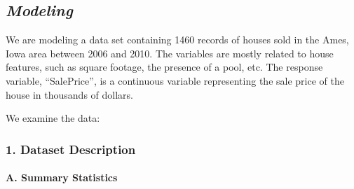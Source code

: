 \documentclass[
]{article}
\begin{document}
\hypertarget{modeling}{%
\subsection{\texorpdfstring{\emph{Modeling}}{Modeling}}\label{modeling}}

We are modeling a data set containing 1460 records of houses sold in the
Ames, Iowa area between 2006 and 2010. The variables are mostly related
to house features, such as square footage, the presence of a pool, etc.
The response variable, ``SalePrice'', is a continuous variable
representing the sale price of the house in thousands of dollars.

We examine the data:

\hypertarget{dataset-description}{%
\subsubsection{1. Dataset Description}\label{dataset-description}}

\hypertarget{a.-summary-statistics}{%
\paragraph{A. Summary Statistics}\label{a.-summary-statistics}}
\end{document}
